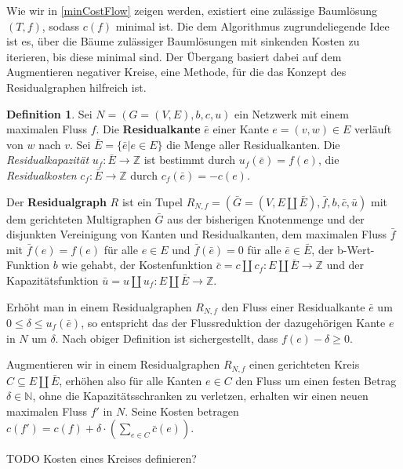 \documentclass[a4paper,twoside,ngerman]{report}
\theoremstyle{plain}
\theoremstyle{definition}
\newtheorem{defn}[thm]{Definition}
\begin{document}
Wie wir in \cref{minCostFlow} zeigen werden, existiert eine zulässige Baumlösung $(T,f)$, sodass $c(f)$ minimal ist. Die dem Algorithmus zugrundeliegende Idee ist es, über die Bäume zulässiger Baumlösungen mit sinkenden Kosten zu iterieren, bis diese minimal sind. Der Übergang basiert dabei auf dem Augmentieren negativer Kreise, eine Methode, für die das Konzept des Residualgraphen hilfreich ist.

\begin{defn}\label{defRes}Sei $N=(G=(V,E),b,c,u)$ ein Netzwerk mit einem maximalen Fluss $f$. Die \textbf{Residualkante} $\bar{e}$ einer Kante $e=(v,w)\in E$ verläuft von $w$ nach $v$. Sei $\bar{E}=\{\bar{e}|e\in E\}$ die Menge aller Residualkanten. Die \textit{Residualkapazität} $u_f:\bar{E}\rightarrow\mathbb{Z}$ ist bestimmt durch $u_f(\bar{e})=f(e)$, die \textit{Residualkosten} $c_f:\bar{E}\rightarrow\mathbb{Z}$ durch $c_f(\bar{e})=-c(e)$.

Der \textbf{Residualgraph} $R$ ist ein Tupel $R_{N,f}=(\bar{G}=(V,E\amalg\bar{E}),\bar{f},b,\bar{c},\bar{u})$ mit dem gerichteten Multigraphen $\bar{G}$ aus der bisherigen Knotenmenge und der disjunkten Vereinigung von Kanten und Residualkanten, dem maximalen Fluss $\bar{f}$ mit $\bar{f}(e)=f(e)$ für alle $e\in E$ und $\bar{f}(\bar{e})=0$ für alle $\bar{e}\in\bar{E}$, der b-Wert-Funktion $b$ wie gehabt, der Kostenfunktion $\bar{c}=c\amalg c_f:E\amalg\bar{E}\rightarrow\mathbb{Z}$ und der Kapazitätsfunktion $\bar{u}=u\amalg u_f:E\amalg\bar{E}\rightarrow\mathbb{Z}$. 
\end{defn}

Erhöht man in einem Residualgraphen $R_{N,f}$ den Fluss einer Residualkante $\bar{e}$ um $0\leq\delta\leq u_f(\bar{e})$, so entspricht das der Flussreduktion der dazugehörigen Kante $e$ in $N$ um $\delta$. Nach obiger Definition ist sichergestellt, dass $f(e)-\delta\geq0$.

Augmentieren wir in einem Residualgraphen $R_{N,f}$ einen gerichteten Kreis $C\subseteq E\amalg\bar{E}$, erhöhen also für alle Kanten $e\in C$ den Fluss um einen festen Betrag $\delta\in\mathbb{N}$, ohne die Kapazitätsschranken zu verletzen, erhalten wir einen neuen maximalen Fluss $f'$ in $N$. Seine Kosten betragen $c(f')=c(f) + \delta\cdot(\sum_{e\in C} \bar{c}(e))$.

TODO Kosten eines Kreises definieren?
\end{document}
